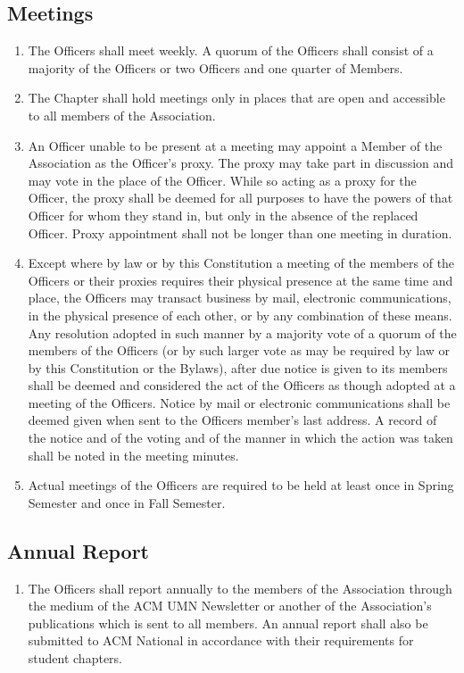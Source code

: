 \subsection{Meetings}
\begin{enumerate}
	\item The Officers shall meet weekly. A quorum of the Officers shall consist of a majority of the Officers or two Officers and one quarter of Members.
	\item The Chapter shall hold meetings only in places that are open and accessible to all members of the Association.
	\item An Officer unable to be present at a meeting may appoint a Member of the Association as the Officer’s proxy. The proxy may take part in discussion and may vote in the place of the Officer. While so acting as a proxy for the Officer, the proxy shall be deemed for all purposes to have the powers of that Officer for whom they stand in, but only in the absence of the replaced Officer. Proxy appointment shall not be longer than one meeting in duration.
	\item Except where by law or by this Constitution a meeting of the members of the Officers or their proxies requires their physical presence at the same time and place, the Officers may transact business by mail, electronic communications, in the physical presence of each other, or by any combination of these means. Any resolution adopted in such manner by a majority vote of a quorum of the members of the Officers (or by such larger vote as may be required by law or by this Constitution or the Bylaws), after due notice is given to its members shall be deemed and considered the act of the Officers as though adopted at a meeting of the Officers. Notice by mail or electronic communications shall be deemed given when sent to the Officers member's last address. A record of the notice and of the voting and of the manner in which the action was taken shall be noted in the meeting minutes.
	\item Actual meetings of the Officers are required to be held at least once in Spring Semester and once in Fall Semester.
\end{enumerate}

\subsection{Annual Report}
\begin{enumerate}
	\item The Officers shall report annually to the members of the Association through the medium of the ACM UMN Newsletter or another of the Association's publications which is sent to all members. An annual report shall also be submitted to ACM National in accordance with their requirements for student chapters.
\end{enumerate}

